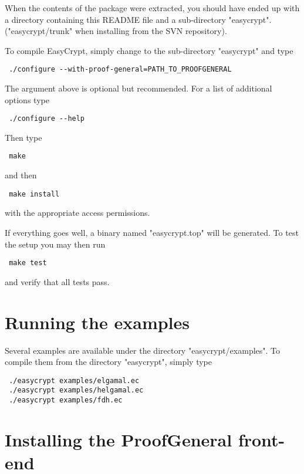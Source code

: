 When the contents of the package were extracted, you should have ended
up with a directory containing this README file and a sub-directory
"easycrypt". ("easycrypt/trunk" when installing from the SVN repository). 

To compile EasyCrypt, simply change to the sub-directory "easycrypt" and type
 
\begin{verbatim}
 ./configure --with-proof-general=PATH_TO_PROOFGENERAL
\end{verbatim}
The argument above is optional but recommended. For a list of additional 
options type

\begin{verbatim}
 ./configure --help
\end{verbatim}

Then type

\begin{verbatim}
 make
\end{verbatim}

and then 

\begin{verbatim}
 make install
\end{verbatim} 

with the appropriate access permissions.

If everything goes well, a binary named "easycrypt.top" will be
generated. To test the setup you may then run

\begin{verbatim}
 make test
\end{verbatim}

and verify that all tests pass.


\section{Running the examples}

Several examples are available under the directory
"easycrypt/examples". To compile them from the directory "easycrypt",
simply type

\begin{verbatim}
 ./easycrypt examples/elgamal.ec
 ./easycrypt examples/helgamal.ec
 ./easycrypt examples/fdh.ec
\end{verbatim}

\section{Installing the ProofGeneral front-end}

